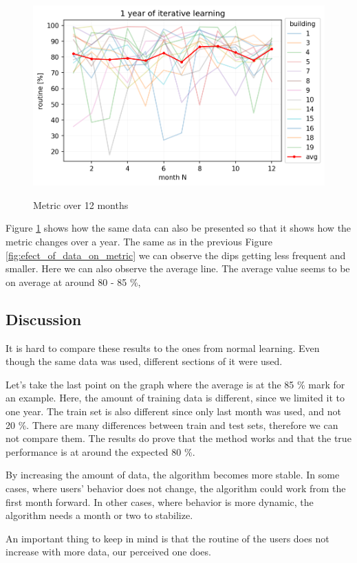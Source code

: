 \begin{figure}[H]
	\centering
	\caption{Metric over 12 months}
	\includegraphics[width=.7\textwidth]{Figures/EC/DYN/1_year_of_iterative_learning_avg.png}
	\label{fig:1_year_of_iterative_learning_avg}
\end{figure}

Figure \ref{fig:1_year_of_iterative_learning_avg} shows how the same data can also be presented so that it shows how the metric changes over a year.
The same as in the previous Figure \ref{fig:efect_of_data_on_metric} we can observe the dips getting less frequent and smaller. 
Here we can also observe the average line. 
The average value seems to be on average at around 80 - 85 \%,

\subsection{Discussion}

It is hard to compare these results to the ones from normal learning.
Even though the same data was used, different sections of it were used.

Let's take the last point on the graph where the average is at the 85 \% mark for an example.
Here, the amount of training data is different, since we limited it to one year. 
The train set is also different since only last month was used, and not 20 \%. 
There are many differences between train and test sets, therefore we can not compare them.
The results do prove that the method works and that the true performance is at around the expected 80 \%.

By increasing the amount of data, the algorithm becomes more stable.
In some cases, where users' behavior does not change, the algorithm could work
from the first month forward. In other cases, where behavior is more dynamic, 
the algorithm needs a month or two to stabilize. 

An important thing to keep in mind is that the routine of the users does not increase with more data,
our perceived one does. 

